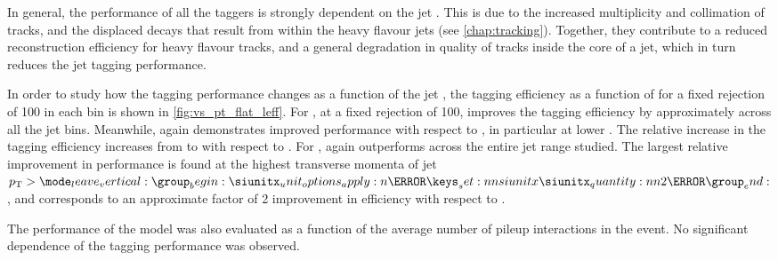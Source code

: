 In general, the performance of all the taggers is strongly dependent on the jet \pt.
This is due to the increased multiplicity and collimation of tracks, and the displaced decays that result from within the heavy flavour jets (see \cref{chap:tracking}).
Together, they contribute to a reduced reconstruction efficiency for heavy flavour tracks, and a general degradation in quality of tracks inside the core of a jet, which in turn reduces the jet tagging performance.

In order to study how the tagging performance changes as a function of the jet \pt, the \bjet tagging efficiency as a function of \pt for a fixed \ljet rejection of 100 in each bin is shown in \cref{fig:vs_pt_flat_leff}.
For \ttbarjets, at a fixed \ljet rejection of 100, \GNN improves the \bjet tagging efficiency by approximately  across all the jet \pt bins.
Meanwhile, \GNNLep again demonstrates improved performance with respect to \GNN, in particular at lower \pt.
The relative increase in the \bjet tagging efficiency increases from  to  with respect to \DLr.
For \Zprimejets, \GNN again outperforms \DLr across the entire jet \pt range studied.
The largest relative improvement in performance is found at the highest transverse momenta of jet $\pt > \SI{2}{\TeV}$, and corresponds to an approximate factor of 2 improvement in efficiency with respect to \DLr.

The performance of the model was also evaluated as a function of the average number of pileup interactions in the event. No significant dependence of the tagging performance was observed.


